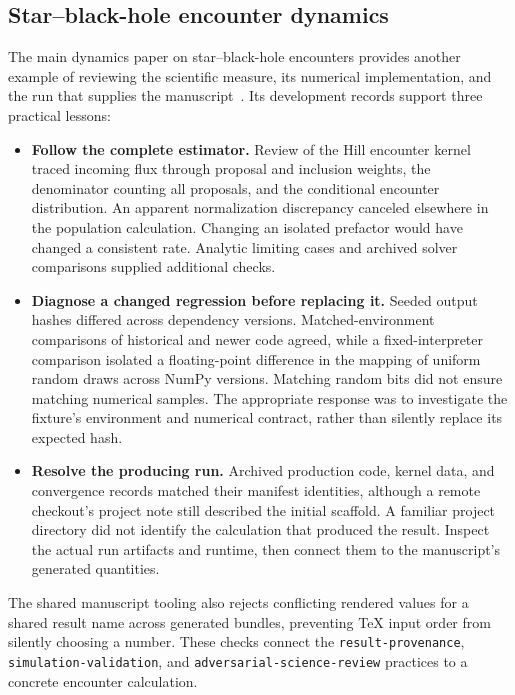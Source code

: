 \documentclass[aps,prd,reprint,nofootinbib]{revtex4-2}
\begin{document}
\subsection{Star--black-hole encounter dynamics}
The main dynamics paper on star--black-hole encounters provides another example of reviewing the scientific measure, its numerical implementation, and the run that supplies the manuscript~\cite{StarBHDynamics}. Its development records support three practical lessons:
\begin{itemize}
\item \textbf{Follow the complete estimator.} Review of the Hill encounter kernel traced incoming flux through proposal and inclusion weights, the denominator counting all proposals, and the conditional encounter distribution. An apparent normalization discrepancy canceled elsewhere in the population calculation. Changing an isolated prefactor would have changed a consistent rate. Analytic limiting cases and archived solver comparisons supplied additional checks.
\item \textbf{Diagnose a changed regression before replacing it.} Seeded output hashes differed across dependency versions. Matched-environment comparisons of historical and newer code agreed, while a fixed-interpreter comparison isolated a floating-point difference in the mapping of uniform random draws across NumPy versions. Matching random bits did not ensure matching numerical samples. The appropriate response was to investigate the fixture's environment and numerical contract, rather than silently replace its expected hash.
\item \textbf{Resolve the producing run.} Archived production code, kernel data, and convergence records matched their manifest identities, although a remote checkout's project note still described the initial scaffold. A familiar project directory did not identify the calculation that produced the result. Inspect the actual run artifacts and runtime, then connect them to the manuscript's generated quantities.
\end{itemize}
The shared manuscript tooling also rejects conflicting rendered values for a shared result name across generated bundles, preventing TeX input order from silently choosing a number. These checks connect the \texttt{result-provenance}, \texttt{simulation-validation}, and \texttt{adversarial-science-review} practices to a concrete encounter calculation.
\end{document}
